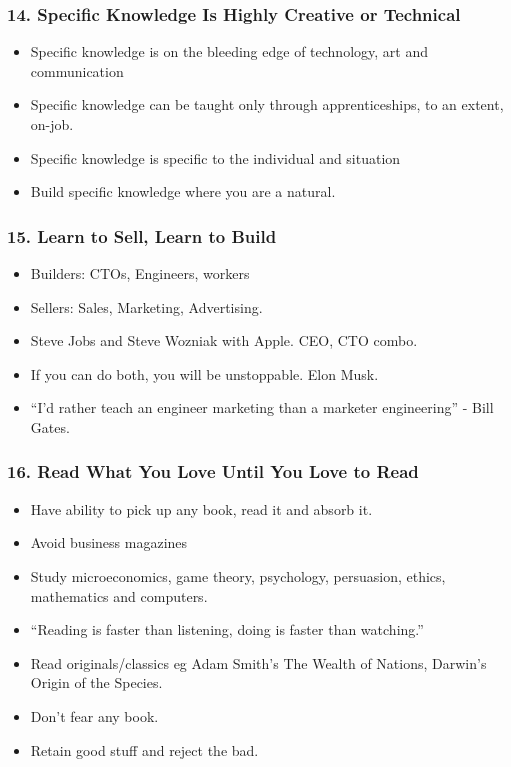 \begin{frame}[fragile]
\frametitle{14. Specific Knowledge Is Highly Creative or Technical}
\begin{itemize}
\item Specific knowledge is on the bleeding edge of technology, art and communication
\item Specific knowledge can be taught only through apprenticeships, to an extent, on-job.
\item Specific knowledge is specific to the individual and situation
\item Build specific knowledge where you are a natural.
\end{itemize}
\end{frame}


\begin{frame}[fragile]
\frametitle{15. Learn to Sell, Learn to Build}
\begin{itemize}
\item Builders: CTOs, Engineers, workers
\item Sellers: Sales, Marketing, Advertising.
\item Steve Jobs and Steve Wozniak with Apple. CEO, CTO combo.
\item If you can do both, you will be unstoppable. Elon Musk.
\item ``I'd rather teach an engineer marketing than a marketer engineering'' - Bill Gates.
\end{itemize}
\end{frame}

\begin{frame}[fragile]
\frametitle{16. Read What You Love Until You Love to Read}
\begin{itemize}
\item Have ability to pick up any book, read it and absorb it.
\item Avoid business magazines
\item Study microeconomics, game theory, psychology, persuasion, ethics, mathematics and computers.
\item ``Reading is faster than listening, doing is faster than watching.''
\item Read originals/classics eg Adam Smith's The Wealth of Nations, Darwin's Origin of the Species.
\item Don't fear any book. 
\item Retain good stuff and reject the bad.
\end{itemize}
\end{frame}

